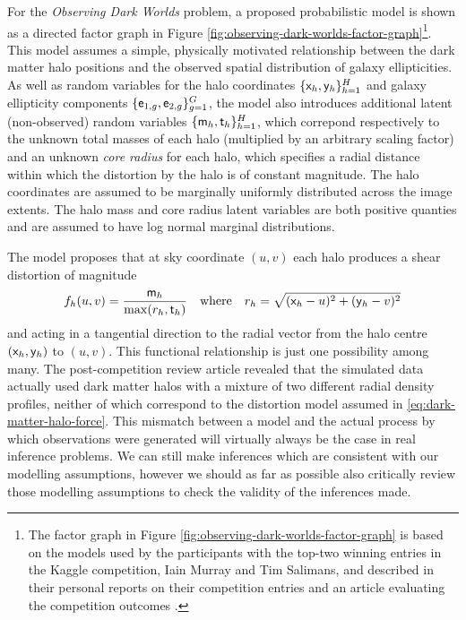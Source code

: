 For the \emph{Observing Dark Worlds} problem, a proposed probabilistic model is shown as a directed factor graph in Figure \ref{fig:observing-dark-worlds-factor-graph}\footnote{The factor graph in Figure \ref{fig:observing-dark-worlds-factor-graph} is based on the models used by the participants with the top-two winning entries in the Kaggle competition, Iain Murray and Tim Salimans, and described in their personal reports on their competition entries \citep{salimans2012observing,murray2012bayesian} and an article evaluating the competition outcomes \citep{harvey2014observing}.}. This model assumes a simple, physically motivated relationship between the dark matter halo positions and the observed spatial distribution of galaxy ellipticities. As well as random variables for the halo coordinates $\lbrace \mathsf{x}_h,\mathsf{y}_h \rbrace_{h=1}^H$ and galaxy ellipticity components $\lbrace \mathsf{e}_{1,g},\mathsf{e}_{2,g} \rbrace_{g=1}^G$, the model also introduces additional latent (non-observed) random variables $\lbrace \mathsf{m}_{h}, \mathsf{t}_h \rbrace_{h=1}^H$, which correpond respectively to the unknown total masses of each halo (multiplied by an arbitrary scaling factor) and an unknown \emph{core radius} for each halo, which specifies a radial distance within which the distortion by the halo is of constant magnitude. The halo coordinates are assumed to be marginally uniformly distributed across the image extents. The halo mass and core radius latent variables are both positive quanties and are assumed to have log normal marginal distributions.

The model proposes that at sky coordinate $(u,v)$ each halo produces a shear distortion of magnitude
\begin{equation}\label{eq:dark-matter-halo-force}
  f_h(u,v) = \frac{\mathsf{m}_h}{\max(r_h,\mathsf{t}_h)}
  \quad\textrm{where}\quad
  r_h = \sqrt{(\mathsf{x}_h - u)^2 + (\mathsf{y}_h - v)^2}
\end{equation}
and acting in a tangential direction to the radial vector from the halo centre $(\mathsf{x}_h,\mathsf{y}_h)$ to $(u,v)$. %
This functional relationship is just one possibility among many. %
The post-competition review article \citep{harvey2014observing} revealed that the simulated data actually used dark matter halos with a mixture of two different radial density profiles, neither of which correspond to the distortion model assumed in \eqref{eq:dark-matter-halo-force}. This mismatch between a model and the actual process by which observations were generated will virtually always be the case in real inference problems. We can still make inferences which are consistent with our modelling assumptions, however we should as far as possible also critically review those modelling assumptions to check the validity of the inferences made.

